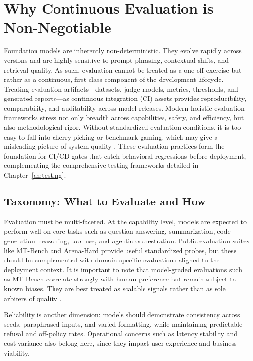 \section{Why Continuous Evaluation is Non-Negotiable}
\label{sec:cicd-why-continuous-eval}
Foundation models are inherently non-deterministic. They evolve rapidly across versions and are highly sensitive to prompt phrasing, contextual shifts, and retrieval quality. As such, evaluation cannot be treated as a one-off exercise but rather as a continuous, first-class component of the development lifecycle. Treating evaluation artifacts---datasets, judge models, metrics, thresholds, and generated reports---as continuous integration (CI) assets provides reproducibility, comparability, and auditability across model releases. Modern holistic evaluation frameworks stress not only breadth across capabilities, safety, and efficiency, but also methodological rigor. Without standardized evaluation conditions, it is too easy to fall into cherry-picking or benchmark gaming, which may give a misleading picture of system quality \cite{helm}. These evaluation practices form the foundation for CI/CD gates that catch behavioral regressions before deployment, complementing the comprehensive testing frameworks detailed in Chapter~\ref{ch:testing}.

\subsection{Taxonomy: What to Evaluate and How}
Evaluation must be multi-faceted. At the capability level, models are expected to perform well on core tasks such as question answering, summarization, code generation, reasoning, tool use, and agentic orchestration. Public evaluation suites like MT-Bench and Arena-Hard provide useful standardized probes, but these should be complemented with domain-specific evaluations aligned to the deployment context. It is important to note that model-graded evaluations such as MT-Bench correlate strongly with human preference but remain subject to known biases. They are best treated as scalable signals rather than as sole arbiters of quality \cite{zheng2023judge,arenaHard2024}.  

Reliability is another dimension: models should demonstrate consistency across seeds, paraphrased inputs, and varied formatting, while maintaining predictable refusal and off-policy rates. Operational concerns such as latency stability and cost variance also belong here, since they impact user experience and business viability.  

